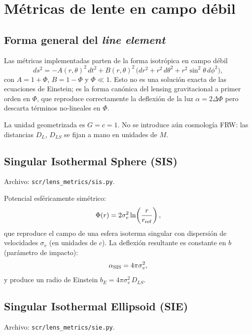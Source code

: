 \documentclass[11pt,a4paper]{article}
\begin{document}
\section{Métricas de lente en campo débil}

\subsection{Forma general del \emph{line element}}

Las métricas implementadas parten de la forma isotrópica en campo débil
\begin{equation}
  ds^2 = -A(r,\theta)^2\, dt^2 + B(r,\theta)^2\,
         \bigl(dr^2 + r^2\,d\theta^2 + r^2\sin^2\theta\, d\phi^2\bigr),
  \label{eq:weak_field}
\end{equation}
con $A = 1 + \Phi$, $B = 1 - \Phi$ y $\Phi \ll 1$. Esto no es una solución
exacta de las ecuaciones de Einstein; es la forma canónica del lensing
gravitacional a primer orden en $\Phi$, que reproduce correctamente la
deflexión de la luz $\alpha = 2\Delta\Phi$ pero descarta términos
no-lineales en $\Phi$.

La unidad geometrizada es $G = c = 1$. No se introduce aún cosmología
FRW: las distancias $D_L$, $D_{LS}$ se fijan a mano en unidades de $M$.

\subsection{Singular Isothermal Sphere (SIS)}

Archivo: \texttt{scr/lens\_metrics/sis.py}.

Potencial esféricamente simétrico:
\begin{equation}
  \Phi(r) = 2\sigma_v^2 \ln\!\left(\frac{r}{r_{\rm ref}}\right),
\end{equation}
que reproduce el campo de una esfera isoterma singular con dispersión de
velocidades $\sigma_v$ (en unidades de $c$). La deflexión resultante es
constante en $b$ (parámetro de impacto):
\begin{equation}
  \alpha_{\rm SIS} = 4\pi\sigma_v^2,
\end{equation}
y produce un radio de Einstein $b_E = 4\pi\sigma_v^2\, D_{LS}$.

\subsection{Singular Isothermal Ellipsoid (SIE)}

Archivo: \texttt{scr/lens\_metrics/sie.py}.
\end{document}
